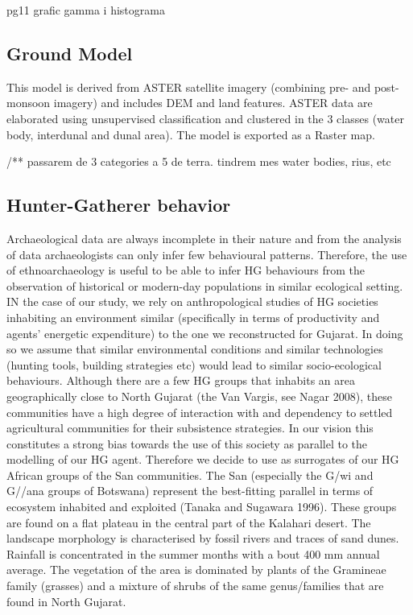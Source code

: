 pg11 grafic gamma i histograma


\subsection{Ground Model}
This model is derived from ASTER satellite imagery (combining pre- and post-monsoon imagery) and
includes DEM and land features. ASTER data are elaborated using unsupervised classification and
clustered in the 3 classes (water body, interdunal and dunal area). The model is exported as a Raster
map.

/** passarem de 3 categories a 5 de terra. tindrem mes water bodies, rius, etc

\subsection{Hunter-Gatherer behavior}
Archaeological data are always incomplete in their nature and from the analysis of data archaeologists
can only infer few behavioural patterns. Therefore, the use of ethnoarchaeology is useful to be able to
infer HG behaviours from the observation of historical or modern-day populations in similar ecological
setting. IN the case of our study, we rely on anthropological studies of HG societies inhabiting an
environment similar (specifically in terms of productivity and agents’ energetic expenditure) to the one
we reconstructed for Gujarat. In doing so we assume that similar environmental conditions and similar
technologies (hunting tools, building strategies etc) would lead to similar socio-ecological behaviours.
Although there are a few HG groups that inhabits an area geographically close to North Gujarat (the
Van Vargis, see Nagar 2008), these communities have a high degree of interaction with and
dependency to settled agricultural communities for their subsistence strategies. In our vision this
constitutes a strong bias towards the use of this society as parallel to the modelling of our HG agent.
Therefore we decide to use as surrogates of our HG African groups of the San communities.
The San (especially the G/wi and G//ana groups of Botswana) represent the best-fitting parallel in
terms of ecosystem inhabited and exploited (Tanaka and Sugawara 1996). These groups are found on
a flat plateau in the central part of the Kalahari desert. The landscape morphology is characterised by
fossil rivers and traces of sand dunes. Rainfall is concentrated in the summer months with a bout 400
mm annual average. The vegetation of the area is dominated by plants of the Gramineae family
(grasses) and a mixture of shrubs of the same genus/families that are found in North Gujarat.

